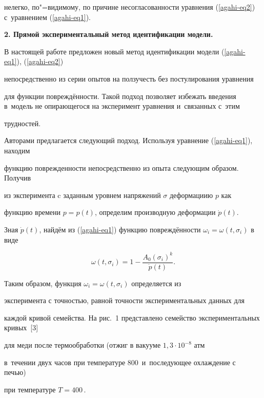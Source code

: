нелегко, по"=видимому, по причине несогласованности уравнения (\ref{agahi-eq2}) с~уравнением (\ref{agahi-eq1}).





\textbf{2. Прямой экспериментальный метод идентификации модели.}

В настоящей работе предложен новый метод идентификации модели (\ref{agahi-eq1}), (\ref{agahi-eq2})

непосредственно из серии опытов на ползучесть без постулирования уравнения

для функции повреждённости. Такой подход позволяет избежать введения в~модель не опирающегося на эксперимент уравнения и~связанных с~этим

трудностей.



Авторами предлагается следующий подход. Используя уравнение (\ref{agahi-eq1}), находим

функцию поврежденности непосредственно из опыта следующим образом. Получив

из эксперимента c заданным уровнем напряжений $\sigma $ деформациию $p$ как

функцию времени $p=p(t)$, определим производную деформации $\dot {p}(t)$.

Зная $\dot {p}(t)$, найдём из (\ref{agahi-eq1}) функцию повреждённости $\omega _i

=\omega (t,\sigma _i )$ в виде

\begin{equation}

\label{agahi-eq3}

\omega (t,\sigma _i )=1-\frac{A_0 \left( {\sigma _i } \right)^k}{\dot {p}(t)}.

\end{equation}

Таким образом, функция $\omega _i =\omega (t,\sigma _i )$ определяется из

эксперимента с точностью, равной точности экспериментальных данных для

каждой кривой  семейства. На рис.~1 представлено  семейство экспериментальных кривых~[3]

для меди после термообработки (отжиг в вакууме $1,3\cdot 10^{-8}$ атм

в~течении двух часов при температуре 800\,\textcelsius{} и~последующее охлаждение с~ печью)

при температуре $T=400$\,\textcelsius.



